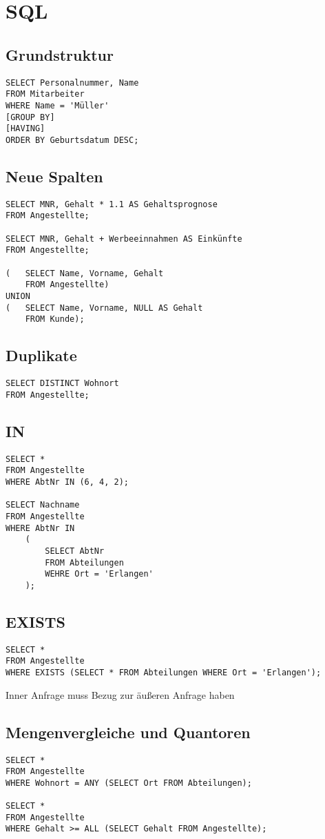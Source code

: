 \section{SQL}
\subsection{Grundstruktur}
\begin{verbatim}
SELECT Personalnummer, Name
FROM Mitarbeiter
WHERE Name = 'Müller'
[GROUP BY]
[HAVING]
ORDER BY Geburtsdatum DESC;
\end{verbatim}
\subsection{Neue Spalten}
\begin{verbatim}
SELECT MNR, Gehalt * 1.1 AS Gehaltsprognose
FROM Angestellte;

SELECT MNR, Gehalt + Werbeeinnahmen AS Einkünfte
FROM Angestellte;

(	SELECT Name, Vorname, Gehalt
	FROM Angestellte)
UNION
(	SELECT Name, Vorname, NULL AS Gehalt
	FROM Kunde);
\end{verbatim}
\subsection{Duplikate}
\begin{verbatim}
SELECT DISTINCT Wohnort
FROM Angestellte;
\end{verbatim}
\subsection{IN}
\begin{verbatim}
SELECT * 
FROM Angestellte
WHERE AbtNr IN (6, 4, 2);

SELECT Nachname
FROM Angestellte
WHERE AbtNr IN
	(	
		SELECT AbtNr
		FROM Abteilungen
		WEHRE Ort = 'Erlangen'
	);
\end{verbatim}
\subsection{EXISTS}
\begin{verbatim}
SELECT * 
FROM Angestellte
WHERE EXISTS (SELECT * FROM Abteilungen WHERE Ort = 'Erlangen'); 
\end{verbatim}
Inner Anfrage muss Bezug zur äußeren Anfrage haben
\subsection{Mengenvergleiche und Quantoren}
\begin{verbatim}
SELECT * 
FROM Angestellte
WHERE Wohnort = ANY (SELECT Ort FROM Abteilungen);

SELECT * 
FROM Angestellte
WHERE Gehalt >= ALL (SELECT Gehalt FROM Angestellte);
\end{verbatim}
